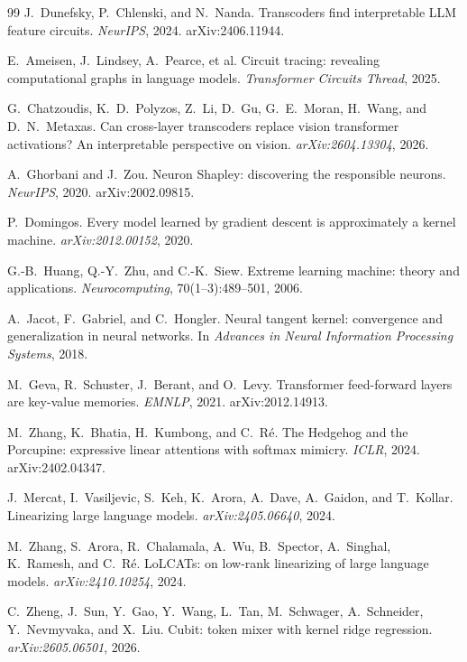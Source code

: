 \documentclass[11pt]{article}
\begin{document}
\begin{thebibliography}{99}
J.~Dunefsky, P.~Chlenski, and N.~Nanda.
Transcoders find interpretable LLM feature circuits.
\emph{NeurIPS}, 2024. arXiv:2406.11944.

E.~Ameisen, J.~Lindsey, A.~Pearce, et al.
Circuit tracing: revealing computational graphs in language
models.
\emph{Transformer Circuits Thread}, 2025.

G.~Chatzoudis, K.~D.~Polyzos, Z.~Li, D.~Gu, G.~E.~Moran,
H.~Wang, and D.~N.~Metaxas.
Can cross-layer transcoders replace vision transformer
activations? An interpretable perspective on vision.
\emph{arXiv:2604.13304}, 2026.

A.~Ghorbani and J.~Zou.
Neuron Shapley: discovering the responsible neurons.
\emph{NeurIPS}, 2020. arXiv:2002.09815.

P.~Domingos.
Every model learned by gradient descent is approximately a kernel
machine.
\emph{arXiv:2012.00152}, 2020.

G.-B.~Huang, Q.-Y.~Zhu, and C.-K.~Siew.
Extreme learning machine: theory and applications.
\emph{Neurocomputing}, 70(1--3):489--501, 2006.

A.~Jacot, F.~Gabriel, and C.~Hongler.
Neural tangent kernel: convergence and generalization in neural
networks.
In \emph{Advances in Neural Information Processing Systems}, 2018.

M.~Geva, R.~Schuster, J.~Berant, and O.~Levy.
Transformer feed-forward layers are key-value memories.
\emph{EMNLP}, 2021. arXiv:2012.14913.

M.~Zhang, K.~Bhatia, H.~Kumbong, and C.~R\'e.
The Hedgehog and the Porcupine: expressive linear attentions with
softmax mimicry.
\emph{ICLR}, 2024. arXiv:2402.04347.

J.~Mercat, I.~Vasiljevic, S.~Keh, K.~Arora, A.~Dave, A.~Gaidon,
and T.~Kollar.
Linearizing large language models.
\emph{arXiv:2405.06640}, 2024.

M.~Zhang, S.~Arora, R.~Chalamala, A.~Wu, B.~Spector, A.~Singhal,
K.~Ramesh, and C.~R\'e.
LoLCATs: on low-rank linearizing of large language models.
\emph{arXiv:2410.10254}, 2024.

C.~Zheng, J.~Sun, Y.~Gao, Y.~Wang, L.~Tan, M.~Schwager,
A.~Schneider, Y.~Nevmyvaka, and X.~Liu.
Cubit: token mixer with kernel ridge regression.
\emph{arXiv:2605.06501}, 2026.


\end{thebibliography}
\end{document}
